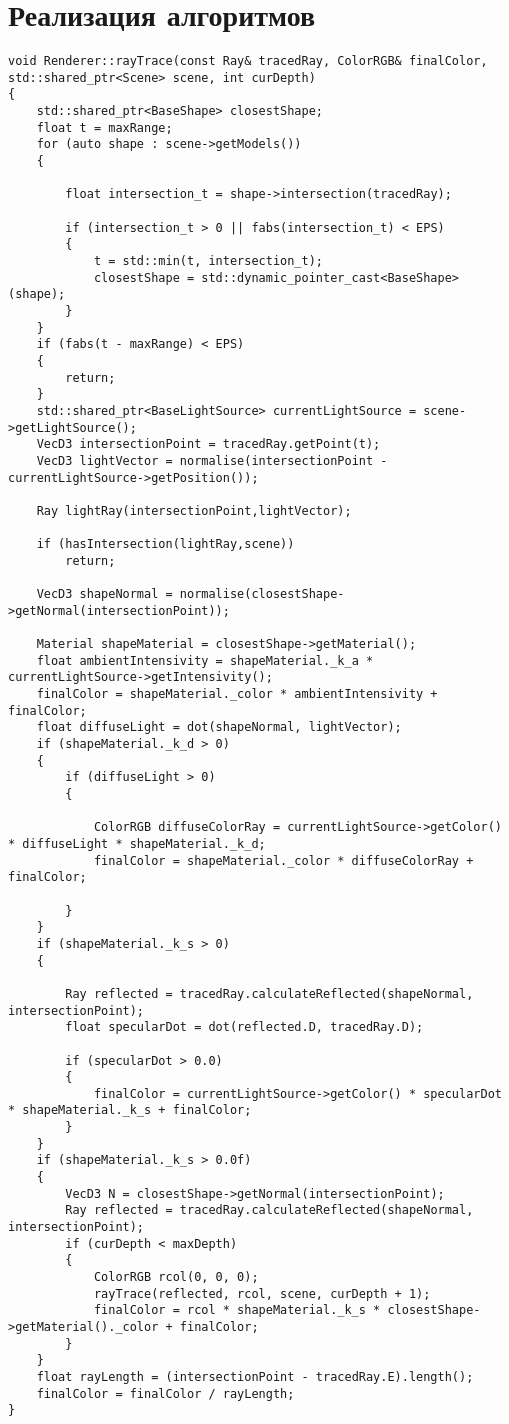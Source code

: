 \section{Реализация алгоритмов}
\begin{lstlisting}[label = lst:raytrace,caption= {Алгоритм обратной трассировки луча}]
    void Renderer::rayTrace(const Ray& tracedRay, ColorRGB& finalColor, std::shared_ptr<Scene> scene, int curDepth)
{
	std::shared_ptr<BaseShape> closestShape;
	float t = maxRange;
	for (auto shape : scene->getModels())
	{

		float intersection_t = shape->intersection(tracedRay);
		
		if (intersection_t > 0 || fabs(intersection_t) < EPS)
		{
			t = std::min(t, intersection_t);
			closestShape = std::dynamic_pointer_cast<BaseShape>(shape);
		}
	}
	if (fabs(t - maxRange) < EPS)
	{
        return;
    }
	std::shared_ptr<BaseLightSource> currentLightSource = scene->getLightSource();
	VecD3 intersectionPoint = tracedRay.getPoint(t);
	VecD3 lightVector = normalise(intersectionPoint - currentLightSource->getPosition());

	Ray lightRay(intersectionPoint,lightVector);
    
	if (hasIntersection(lightRay,scene))
		return;

	VecD3 shapeNormal = normalise(closestShape->getNormal(intersectionPoint));

	Material shapeMaterial = closestShape->getMaterial();
	float ambientIntensivity = shapeMaterial._k_a * currentLightSource->getIntensivity();
	finalColor = shapeMaterial._color * ambientIntensivity + finalColor;
	float diffuseLight = dot(shapeNormal, lightVector);
	if (shapeMaterial._k_d > 0)
	{
		if (diffuseLight > 0)
		{
			
			ColorRGB diffuseColorRay = currentLightSource->getColor() * diffuseLight * shapeMaterial._k_d;
			finalColor = shapeMaterial._color * diffuseColorRay + finalColor;

		}
	}
	if (shapeMaterial._k_s > 0)
	{

		Ray reflected = tracedRay.calculateReflected(shapeNormal, intersectionPoint);
		float specularDot = dot(reflected.D, tracedRay.D);
	
		if (specularDot > 0.0)
		{
			finalColor = currentLightSource->getColor() * specularDot * shapeMaterial._k_s + finalColor;
		}
	}
	if (shapeMaterial._k_s > 0.0f)
	{
		VecD3 N = closestShape->getNormal(intersectionPoint);
		Ray reflected = tracedRay.calculateReflected(shapeNormal, intersectionPoint);
		if (curDepth < maxDepth)
		{
			ColorRGB rcol(0, 0, 0);
			rayTrace(reflected, rcol, scene, curDepth + 1);
			finalColor = rcol * shapeMaterial._k_s * closestShape->getMaterial()._color + finalColor;
		}
	}
	float rayLength = (intersectionPoint - tracedRay.E).length();
	finalColor = finalColor / rayLength;
}
\end{lstlisting}

